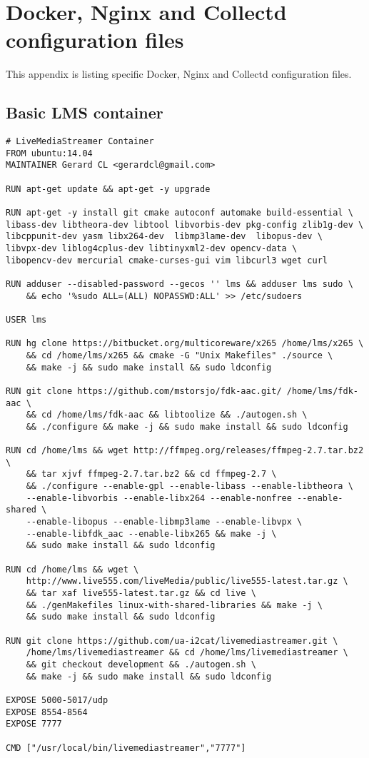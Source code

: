 \chapter{Docker, Nginx and Collectd configuration files}\label{ANX:dockerFiles}

This appendix is listing specific Docker, Nginx and Collectd configuration files.

\section{Basic LMS container}\label{ANX:dockerFiles1}

\begin{verbatim}
# LiveMediaStreamer Container
FROM ubuntu:14.04
MAINTAINER Gerard CL <gerardcl@gmail.com>

RUN apt-get update && apt-get -y upgrade

RUN apt-get -y install git cmake autoconf automake build-essential \ 
libass-dev libtheora-dev libtool libvorbis-dev pkg-config zlib1g-dev \
libcppunit-dev yasm libx264-dev  libmp3lame-dev  libopus-dev \
libvpx-dev liblog4cplus-dev libtinyxml2-dev opencv-data \
libopencv-dev mercurial cmake-curses-gui vim libcurl3 wget curl 

RUN adduser --disabled-password --gecos '' lms && adduser lms sudo \
	&& echo '%sudo ALL=(ALL) NOPASSWD:ALL' >> /etc/sudoers

USER lms

RUN hg clone https://bitbucket.org/multicoreware/x265 /home/lms/x265 \
	&& cd /home/lms/x265 && cmake -G "Unix Makefiles" ./source \
	&& make -j && sudo make install && sudo ldconfig

RUN git clone https://github.com/mstorsjo/fdk-aac.git/ /home/lms/fdk-aac \
	&& cd /home/lms/fdk-aac && libtoolize && ./autogen.sh \
	&& ./configure && make -j && sudo make install && sudo ldconfig

RUN cd /home/lms && wget http://ffmpeg.org/releases/ffmpeg-2.7.tar.bz2 \
	&& tar xjvf ffmpeg-2.7.tar.bz2 && cd ffmpeg-2.7 \
	&& ./configure --enable-gpl --enable-libass --enable-libtheora \
	--enable-libvorbis --enable-libx264 --enable-nonfree --enable-shared \
	--enable-libopus --enable-libmp3lame --enable-libvpx \
	--enable-libfdk_aac --enable-libx265 && make -j \
	&& sudo make install && sudo ldconfig

RUN cd /home/lms && wget \
	http://www.live555.com/liveMedia/public/live555-latest.tar.gz \
	&& tar xaf live555-latest.tar.gz && cd live \
	&& ./genMakefiles linux-with-shared-libraries && make -j \
	&& sudo make install && sudo ldconfig

RUN git clone https://github.com/ua-i2cat/livemediastreamer.git \
	/home/lms/livemediastreamer && cd /home/lms/livemediastreamer \
	&& git checkout development && ./autogen.sh \
	&& make -j && sudo make install && sudo ldconfig

EXPOSE 5000-5017/udp
EXPOSE 8554-8564
EXPOSE 7777

CMD ["/usr/local/bin/livemediastreamer","7777"] 
\end{verbatim}

